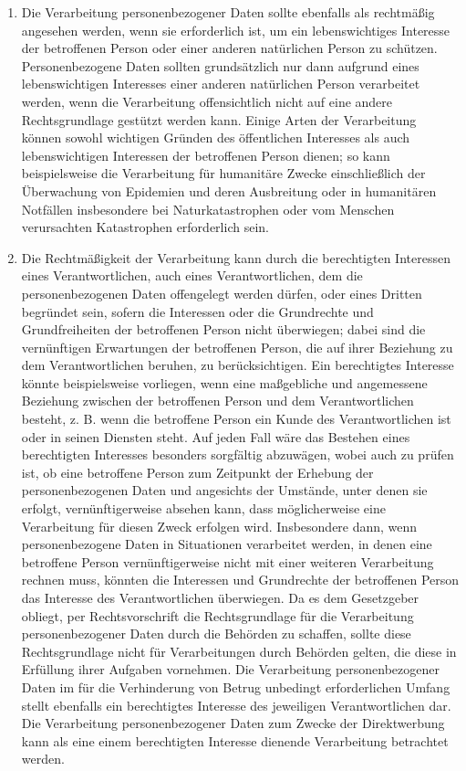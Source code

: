 \begin{enumerate}
   \item Die Verarbeitung personenbezogener Daten sollte ebenfalls als rechtmäßig angesehen werden, wenn sie
    erforderlich ist, um ein lebenswichtiges Interesse der betroffenen Person oder einer anderen natürlichen Person zu
    schützen. Personenbezogene Daten sollten grundsätzlich nur dann aufgrund eines lebenswichtigen Interesses einer
    anderen natürlichen Person verarbeitet werden, wenn die Verarbeitung offensichtlich nicht auf eine andere
    Rechtsgrundlage gestützt werden kann. Einige Arten der Verarbeitung können sowohl wichtigen Gründen des
    öffentlichen Interesses als auch lebenswichtigen Interessen der betroffenen Person dienen; so kann beispielsweise
    die Verarbeitung für humanitäre Zwecke einschließlich der Überwachung von Epidemien und deren Ausbreitung oder in
    humanitären Notfällen insbesondere bei Naturkatastrophen oder vom Menschen verursachten Katastrophen erforderlich
    sein.%
   \label{itm:eg-46}
   

   \item Die Rechtmäßigkeit der Verarbeitung kann durch die berechtigten Interessen eines Verantwortlichen, auch eines
    Verantwortlichen, dem die personenbezogenen Daten offengelegt werden dürfen, oder eines Dritten begründet sein,
    sofern die Interessen oder die Grundrechte und Grundfreiheiten der betroffenen Person nicht überwiegen; dabei sind
    die vernünftigen Erwartungen der betroffenen Person, die auf ihrer Beziehung zu dem Verantwortlichen beruhen, zu
    berücksichtigen. Ein berechtigtes Interesse könnte beispielsweise vorliegen, wenn eine maßgebliche und angemessene
    Beziehung zwischen der betroffenen Person und dem Verantwortlichen besteht, z. B. wenn die betroffene Person ein
    Kunde des Verantwortlichen ist oder in seinen Diensten steht. Auf jeden Fall wäre das Bestehen eines berechtigten
    Interesses besonders sorgfältig abzuwägen, wobei auch zu prüfen ist, ob eine betroffene Person zum Zeitpunkt der
    Erhebung der personenbezogenen Daten und angesichts der Umstände, unter denen sie erfolgt, vernünftigerweise
    absehen kann, dass möglicherweise eine Verarbeitung für diesen Zweck erfolgen wird. Insbesondere dann, wenn
    personenbezogene Daten in Situationen verarbeitet werden, in denen eine betroffene Person vernünftigerweise nicht
    mit einer weiteren Verarbeitung rechnen muss, könnten die Interessen und Grundrechte der betroffenen Person das
    Interesse des Verantwortlichen überwiegen. Da es dem Gesetzgeber obliegt, per Rechtsvorschrift die Rechtsgrundlage
    für die Verarbeitung personenbezogener Daten durch die Behörden zu schaffen, sollte diese Rechtsgrundlage nicht für
    Verarbeitungen durch Behörden gelten, die diese in Erfüllung ihrer Aufgaben vornehmen. Die Verarbeitung
    personenbezogener Daten im für die Verhinderung von Betrug unbedingt erforderlichen Umfang stellt ebenfalls ein
    berechtigtes Interesse des jeweiligen Verantwortlichen dar. Die Verarbeitung personenbezogener Daten zum Zwecke der
    Direktwerbung kann als eine einem berechtigten Interesse dienende Verarbeitung betrachtet werden.%
   \label{itm:eg-47}
   

\end{enumerate}
